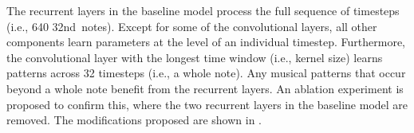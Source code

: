 
The recurrent layers in the baseline model process the full
sequence of timesteps (i.e., 640 \gls{32nd}~notes). Except
for some of the convolutional layers, all other components
learn parameters at the level of an individual timestep.
Furthermore, the convolutional layer with the longest time
window (i.e., kernel size) learns patterns across 32
timesteps (i.e., a \gls{whole} note). Any musical patterns
that occur beyond a \gls{whole} note benefit from the
recurrent layers. An ablation experiment is proposed to
confirm this, where the two recurrent layers in the baseline
model are removed. The modifications proposed are shown in
.

